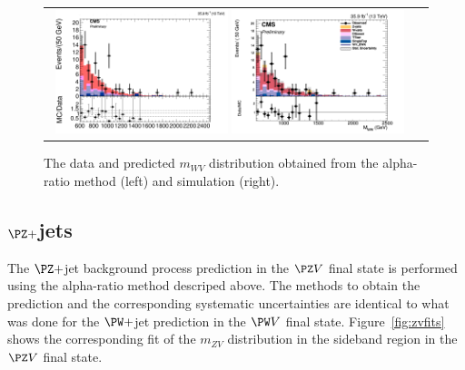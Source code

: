 \begin{figure}[htbp] 
	 \centering 
	 \begin{tabular}{cc}
	 \includegraphics[width=0.48\textwidth]{Plots/BackgroundEstimation/WV/signal_region_Closure_test_AfterCorrShape_38bins.png}
         \includegraphics[width=0.48\textwidth]{Plots/BackgroundEstimation/WV/DibosonBoostedElMuCuts13TeV_WjetControlRegion_Tighter_CHS_mass_lvj_type0_PuppiAK8_ClosureTest_SignalRegion.png}  
	 \end{tabular}
	 \caption{The data and predicted $m_{WV}$ distribution obtained from the alpha-ratio method (left) and simulation (right).}
	 \label{fig:closure}
\end{figure}


\subsection{$\PZ+$jets}
The $\PZ+$jet background process prediction in the $\PZ V$ final state is performed using the alpha-ratio method descriped above. The methods to obtain the prediction and the corresponding systematic uncertainties are identical to what was done for the $\PW+$jet prediction in the $\PW V$ final state. Figure~\ref{fig:zvfits} shows the corresponding fit of the $m_{ZV}$ distribution in the sideband region in the $\PZ V$ final state.  

